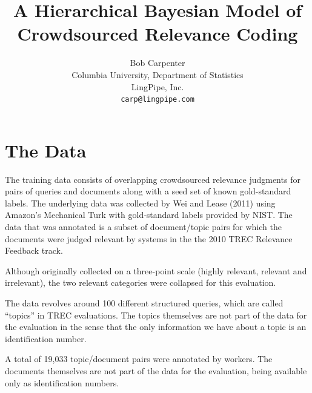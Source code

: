 \documentclass{article}
\title{A Hierarchical Bayesian Model of\\ 
Crowdsourced Relevance Coding}
\author{Bob Carpenter
\\[4pt] Columbia University, Department of Statistics
\\[4pt] LingPipe, Inc.
\\[4pt] \texttt{carp@lingpipe.com}}
\begin{document}
\maketitle



\section{The Data}

The training data consists of overlapping crowdsourced relevance
judgments for pairs of queries and documents along with a seed set of
known gold-standard labels.  The underlying data was
collected by Wei and Lease (2011) using Amazon's Mechanical Turk 
with gold-standard labels provided by NIST.  The data that was
annotated is a subset of document/topic pairs for which the documents
were judged relevant by systems in the the 2010 TREC Relevance
Feedback track. 

Although originally collected on a three-point scale (highly relevant,
relevant and irrelevant), the two relevant categories were collapsed
for this evaluation.

The data revolves around 100 different structured queries, which are
called ``topics'' in TREC evaluations.  The topics themselves are not
part of the data for the evaluation in the sense that the only
information we have about a topic is an identification number.

A total of 19,033 topic/document pairs were annotated by workers.  The
documents themselves are not part of the data for the evaluation, being
available only as identification numbers.
\end{document}
